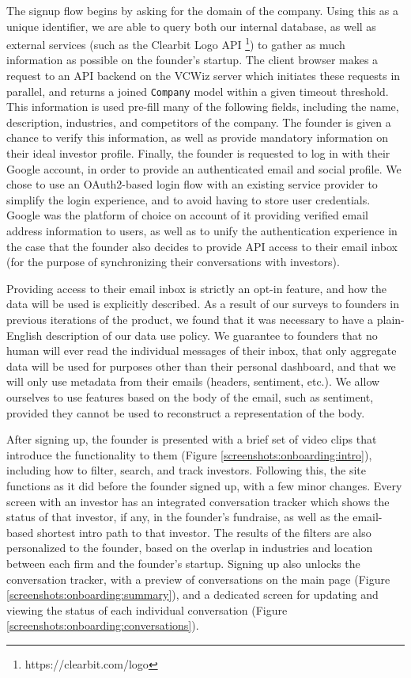 The signup flow begins by asking for the domain of the company. Using this as a unique identifier, we are able to query both our internal database, as well as external services (such as the Clearbit Logo API \footnote{https://clearbit.com/logo}) to gather as much information as possible on the founder's startup. The client browser makes a request to an API backend on the VCWiz server which initiates these requests in parallel, and returns a joined \texttt{Company} model within a given timeout threshold. This information is used pre-fill many of the following fields, including the name, description, industries, and competitors of the company. The founder is given a chance to verify this information, as well as provide mandatory information on their ideal investor profile. Finally, the founder is requested to log in with their Google account, in order to provide an authenticated email and social profile. We chose to use an OAuth2-based \cite{hardt2012oauth} login flow with an existing service provider to simplify the login experience, and to avoid having to store user credentials. Google was the platform of choice on account of it providing verified email address information to users, as well as to unify the authentication experience in the case that the founder also decides to provide API access to their email inbox (for the purpose of synchronizing their conversations with investors).

Providing access to their email inbox is strictly an opt-in feature, and how the data will be used is explicitly described. As a result of our surveys to founders in previous iterations of the product, we found that it was necessary to have a plain-English description of our data use policy. We guarantee to founders that no human will ever read the individual messages of their inbox, that only aggregate data will be used for purposes other than their personal dashboard, and that we will only use metadata from their emails (headers, sentiment, etc.).  We allow ourselves to use features based on the body of the email, such as sentiment, provided they cannot be used to reconstruct a representation of the body.

After signing up, the founder is presented with a brief set of video clips that introduce the functionality to them (Figure \ref{screenshots:onboarding:intro}), including how to filter, search, and track investors. Following this, the site functions as it did before the founder signed up, with a few minor changes. Every screen with an investor has an integrated conversation tracker which shows the status of that investor, if any, in the founder's fundraise, as well as the email-based shortest intro path to that investor. The results of the filters are also personalized to the founder, based on the overlap in industries and location between each firm and the founder's startup. Signing up also unlocks the conversation tracker, with a preview of conversations on the main page (Figure \ref{screenshots:onboarding:summary}), and a dedicated screen for updating and viewing the status of each individual conversation (Figure \ref{screenshots:onboarding:conversations}).

